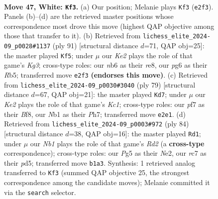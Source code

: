 \documentclass[11pt]{article}
\begin{document}
\clearpage

\begin{figure}[p]\centering
\begin{subfigure}{0.46\textwidth}\centering
\resizebox{\linewidth}{!}{%
\newchessgame
\chessboard[
  setfen={3r2k1/2r2p1p/1n4p1/p3p1P1/P3P3/1P4RP/4K1P1/RN6 w - - 8 47},
  showmover=false,
  pgfstyle=straightmove, color=movearrow, markmove={e2-f3}
]}
\caption{}
\end{subfigure}\hfill
\begin{subfigure}{0.46\textwidth}\centering
\resizebox{\linewidth}{!}{%
\newchessgame
\chessboard[
  setfen={4R3/8/6k1/pr4p1/4pr1p/2P4P/P3R1PK/8 b - - 3 46},
  showmover=false,
  pgfstyle=straightmove, color=movearrow, markmove={g6-f5}
]}
\caption{}
\end{subfigure}
\\[4pt]
\begin{subfigure}{0.46\textwidth}\centering
\resizebox{\linewidth}{!}{%
\newchessgame
\chessboard[
  setfen={2k2b2/p1r4p/5pp1/NR6/P1pp2P1/5P1P/1PPK4/8 b - - 3 40},
  showmover=false,
  pgfstyle=straightmove, color=movearrow, markmove={c8-d7}
]}
\caption{}
\end{subfigure}\hfill
\begin{subfigure}{0.46\textwidth}\centering
\resizebox{\linewidth}{!}{%
\newchessgame
\chessboard[
  setfen={8/2r2k2/p4n2/1p1pr1p1/6Pp/P2R1P1P/1P1RNK2/8 w - - 0 43},
  showmover=false,
  pgfstyle=straightmove, color=movearrow, markmove={d2-d1}
]}
\caption{}
\end{subfigure}
\caption{\textbf{Move 47, White: \texttt{Kf3}.} (a) Our position; Melanie plays \texttt{Kf3} (\texttt{e2f3}). Panels (b)--(d) are the retrieved master positions whose correspondence most drove this move (highest QAP objective among those that transfer to it). (b) Retrieved from \texttt{lichess\_elite\_2024-09\_p0028\#1137} (ply 91) [structural distance $d$=71, QAP obj=25]: the master played \texttt{Kf5}; under $\mu$ our \emph{Ke2} plays the role of that game's \emph{Kg3}; cross-type roles: our \emph{n}b6 as their \emph{r}e8, our \emph{p}g6 as their \emph{R}b5; transferred move \texttt{e2f3} \textbf{(endorses this move)}. (c) Retrieved from \texttt{lichess\_elite\_2024-09\_p0030\#3040} (ply 79) [structural distance $d$=67, QAP obj=21]: the master played \texttt{Kd7}; under $\mu$ our \emph{Ke2} plays the role of that game's \emph{Kc1}; cross-type roles: our \emph{p}f7 as their \emph{B}f8, our \emph{N}b1 as their \emph{P}h7; transferred move \texttt{e2e1}. (d) Retrieved from \texttt{lichess\_elite\_2024-09\_p0003\#972} (ply 84) [structural distance $d$=38, QAP obj=16]: the master played \texttt{Rd1}; under $\mu$ our \emph{Nb1} plays the role of that game's \emph{Rd2} (a \textbf{cross-type} correspondence); cross-type roles: our \emph{P}g5 as their \emph{N}e2, our \emph{r}c7 as their \emph{p}d5; transferred move \texttt{b1a3}. Synthesis: 1 retrieved analog transferred to \texttt{Kf3} (summed QAP objective 25, the strongest correspondence among the candidate moves); Melanie committed it via the \texttt{search} selector.}
\label{fig:thought-m92}
\end{figure}
\end{document}
